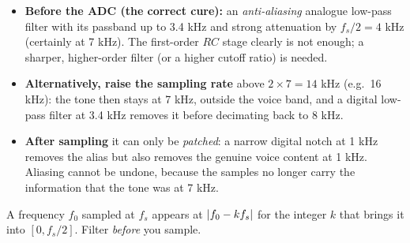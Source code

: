 \begin{solution}
\begin{itemize}[leftmargin=1.4em,itemsep=2pt]
\item \textbf{Before the ADC (the correct cure):} an \emph{anti-aliasing} analogue low-pass filter with its passband up to 3.4 kHz and strong attenuation by $f_s/2=4$ kHz (certainly at 7 kHz). The first-order $RC$ stage clearly is not enough; a sharper, higher-order filter (or a higher cutoff ratio) is needed.
\item \textbf{Alternatively, raise the sampling rate} above $2\times7=14$ kHz (e.g.\ 16 kHz): the tone then stays at 7 kHz, outside the voice band, and a digital low-pass filter at 3.4 kHz removes it before decimating back to 8 kHz.
\item \textbf{After sampling} it can only be \emph{patched}: a narrow digital notch at 1 kHz removes the alias but also removes the genuine voice content at 1 kHz. Aliasing cannot be undone, because the samples no longer carry the information that the tone was at 7 kHz.
\end{itemize}
\begin{keyidea}A frequency $f_0$ sampled at $f_s$ appears at $\lvert f_0-kf_s\rvert$ for the integer $k$ that brings it into $[0,f_s/2]$. Filter \emph{before} you sample.\end{keyidea}
\end{solution}

